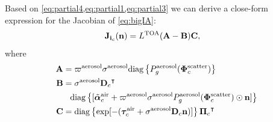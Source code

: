 \documentclass[10pt,letterpaper]{article}
\newcommand{\OpDiag}[1]{\mathrm{diag}\left\{#1\right\}}
\newcommand{\vect}[1]{\bm{#1}}
\newcommand{\transpose}[1]{{#1}^\intercal}
\begin{document}
Based on \cref{eq:partial4,eq:partial1,eq:partial3} we can derive a
close-form expression for the Jacobian of \cref{eq:bigIA}:
\begin{align}
  {\bf J}_{{\bf i}_c}({\bf n}) &= L^{\rm TOA}({\bf A}-{\bf B}){\bf C}
  ,
  \label{eq:gradient2}
\end{align}
where
\begin{align}
  \label{eq:gradient3}
  {\bf A} &= \varpi^{\rm aerosol}\sigma^{\rm aerosol}
  \OpDiag{ P_g^{\rm aerosol}(\vect{\Phi}^{\rm scatter}_c)} \nonumber\\
  {\bf B} &= {\sigma}^{\rm aerosol}\transpose{{\bf D}_c} \nonumber\\
  & \;\;\; \OpDiag{[\tilde{\vect{\alpha}}^{\rm air}_c + \varpi^{\rm
      aerosol}\sigma^{\rm aerosol} P^{\rm aerosol}_g(\vect{\Phi}^{\rm
      scatter}_c) \odot{\bf n}
    ]} \nonumber \\
  {\bf C} &= \OpDiag{\exp[-(\vect{\tau}_c^{\rm air} + {\sigma}^{\rm
      aerosol} {\bf D}_c {\bf n})]} \transpose{{\vect{\Pi}}_c}
\end{align}
\end{document}
